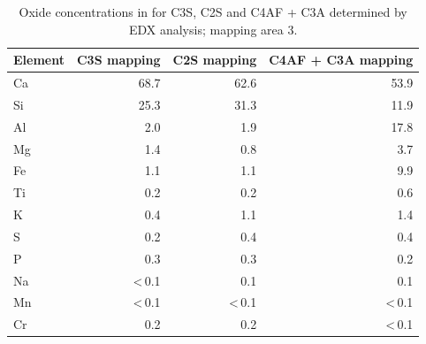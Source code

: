 \begin{table}[!htb]
	\caption{
		Oxide concentrations in \unit{\wtpercent} for \ac{C3S}, \ac{C2S} and \ac{C4AF} + \ac{C3A} determined by \ac{EDX} analysis; mapping area \num{3}.
	}
	\label{tab:laicpms1-area3}
	\begin{tabular*}{\linewidth}{@{\extracolsep{\fill}} lrrr}
	\toprule
	Element & \ac{C3S} mapping & \ac{C2S} mapping & \ac{C4AF} + \ac{C3A} mapping \\ \midrule
	Ca & 68.7           & 62.6           & 53.9           \\
	Si & 25.3           & 31.3           & 11.9           \\
	Al & 2.0            & 1.9            & 17.8           \\
	Mg & 1.4            & 0.8            & 3.7            \\
	Fe & 1.1            & 1.1            & 9.9            \\
	Ti & 0.2            & 0.2            & 0.6            \\
	K  & 0.4            & 1.1            & 1.4            \\
	S  & 0.2            & 0.4            & 0.4            \\
	P  & 0.3            & 0.3            & 0.2            \\
	Na & <\,0.1 & 0.1            & 0.1            \\
	Mn & <\,0.1 & <\,0.1 & <\,0.1 \\
	Cr & 0.2            & 0.2            & <\,0.1 \\ \bottomrule 
	\end{tabular*}
\end{table}

